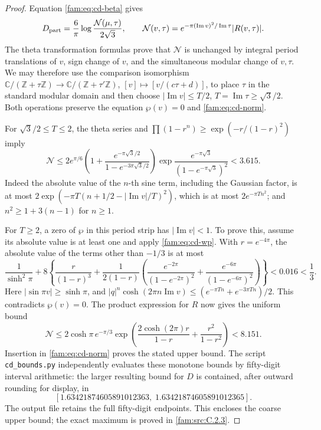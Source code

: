 \begin{proof}
Equation \eqref{fam:eq:cd-beta} gives
\begin{equation}\label{fam:eq:cd-norm}
 D_{\rm part}=\frac6\pi\log\frac{\mathcal N(\mu,\tau)}{2\sqrt3},
 \qquad
 \mathcal N(v,\tau)=e^{-\pi(\operatorname{Im}v)^2/\operatorname{Im}\tau}
 |R(v,\tau)|.
\end{equation}
The theta transformation formulas prove that \(\mathcal N\) is unchanged
by integral period translations of \(v\), sign change of \(v\), and the
simultaneous modular change of \(v,\tau\). We may therefore use the
comparison isomorphism \(\mathbb C/(\mathbb Z+\tau\mathbb Z)\to
\mathbb C/(\mathbb Z+\tau'\mathbb Z)\), \([v]\mapsto[v/(c\tau+d)]\), to
place \(\tau\) in the standard modular domain and then choose
\(|\operatorname{Im}v|\leq T/2\), \(T=\operatorname{Im}\tau\geq\sqrt3/2\).
Both operations preserve the equation \(\wp(v)=0\) and \eqref{fam:eq:cd-norm}.

For \(\sqrt3/2\leq T\leq2\), the theta series and
\(\prod(1-r^n)\geq\exp(-r/(1-r)^2)\) imply
\[
 \mathcal N\leq
 2e^{\pi/6}\left(1+\frac{e^{-\pi\sqrt3/2}}
 {1-e^{-3\pi\sqrt3/2}}\right)
 \exp\frac{e^{-\pi\sqrt3}}{(1-e^{-\pi\sqrt3})^2}
 <3.615.
\]
Indeed the absolute value of the \(n\)-th sine term, including the
Gaussian factor, is at most
\(2\exp(-\pi T(n+1/2-|\operatorname{Im}v|/T)^2)\), which is at most
\(2e^{-\pi Tn^2}\); and \(n^2\geq1+3(n-1)\) for \(n\geq1\).

For \(T\geq2\), a zero of \(\wp\) in this period strip has
\(|\operatorname{Im}v|<1\). To prove this, assume its absolute value is at
least one and apply \eqref{fam:eq:cd-wp}. With \(r=e^{-4\pi}\), the absolute
value of the terms other than \(-1/3\) is at most
\[
 \frac1{\sinh^2\pi}+8\left\{
 \frac r{(1-r)^3}+\frac1{2(1-r)}
 \left(\frac{e^{-2\pi}}{(1-e^{-2\pi})^2}
 +\frac{e^{-6\pi}}{(1-e^{-6\pi})^2}\right)\right\}<0.016<\frac13.
\]
Here \(|\sin\pi v|\geq\sinh\pi\), and
\(|q|^n\cosh(2\pi n\operatorname{Im}v)\leq
(e^{-\pi Tn}+e^{-3\pi Tn})/2\). This contradicts \(\wp(v)=0\).
The product expression for \(R\) now gives the uniform bound
\[
 \mathcal N\leq2\cosh\pi\,e^{-\pi/3}
 \exp\left(\frac{2\cosh(2\pi)r}{1-r}+\frac{r^2}{1-r^2}\right)
 <8.151.
\]
Insertion in \eqref{fam:eq:cd-norm} proves the stated upper bound. The script
\texttt{cd\_bounds.py} independently evaluates these monotone bounds by
fifty-digit interval arithmetic: the larger resulting bound for \(D\) is
contained, after outward rounding for display, in
\[
 [1.63421874605891012363,\;1.63421874605891012365].
\]
The output file retains the full fifty-digit endpoints.
This encloses the coarse upper bound; the exact maximum is proved in \ref{fam:src:C.2.3}.


\end{proof}
